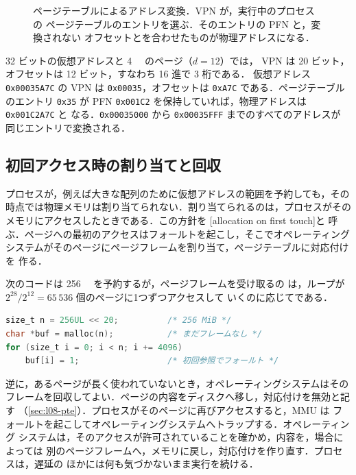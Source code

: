 \documentclass[../main.tex]{subfiles}
\begin{document}
\begin{figure}[htbp]
  \centering
  
  \caption{ページテーブルによるアドレス変換．VPN が，実行中のプロセスの
    ページテーブルのエントリを選ぶ．そのエントリの PFN と，変換されない
    オフセットとを合わせたものが物理アドレスになる．}
  \label{fig:l08-translation}
\end{figure}

\begin{example}
  32 ビットの仮想アドレスと \SI{4}{\kibi\byte} のページ（$d = 12$）では，
  VPN は 20 ビット，オフセットは 12 ビット，すなわち 16 進で 3 桁である．
  仮想アドレス \texttt{0x00035A7C} の VPN は \texttt{0x00035}，オフセットは
  \texttt{0xA7C} である．ページテーブルのエントリ \texttt{0x35} が PFN
  \texttt{0x001C2} を保持していれば，物理アドレスは \texttt{0x001C2A7C} と
  なる．\texttt{0x00035000} から \texttt{0x00035FFF} までのすべてのアドレスが
  同じエントリで変換される．
\end{example}

\subsection{初回アクセス時の割り当てと回収}

プロセスが，例えば大きな配列のために仮想アドレスの範囲を予約しても，その
時点では物理メモリは割り当てられない．割り当てられるのは，プロセスがその
メモリにアクセスしたときである．この方針を
[allocation on first touch]と
呼ぶ．ページへの最初のアクセスはフォールトを起こし，そこでオペレーティング
システムがそのページにページフレームを割り当て，ページテーブルに対応付けを
作る．

\begin{example}
  次のコードは \SI{256}{\mebi\byte} を予約するが，ページフレームを受け取るの
  は，ループが $2^{28}/2^{12} = 65\,536$ 個のページに1つずつアクセスして
  いくのに応じてである．
  \begin{lstlisting}[language=C, numbers=none]
size_t n = 256UL << 20;          /* 256 MiB */
char *buf = malloc(n);           /* まだフレームなし */
for (size_t i = 0; i < n; i += 4096)
    buf[i] = 1;                  /* 初回参照でフォールト */
\end{lstlisting}
\end{example}

逆に，あるページが長く使われていないとき，オペレーティングシステムはその
フレームを回収してよい．ページの内容をディスクへ移し，対応付けを無効と記す
（\cref{sec:l08-pte}）．プロセスがそのページに再びアクセスすると，MMU は
フォールトを起こしてオペレーティングシステムへトラップする．オペレーティング
システムは，そのアクセスが許可されていることを確かめ，内容を，場合によっては
別のページフレームへ，メモリに戻し，対応付けを作り直す．プロセスは，遅延の
ほかには何も気づかないまま実行を続ける．
\end{document}
